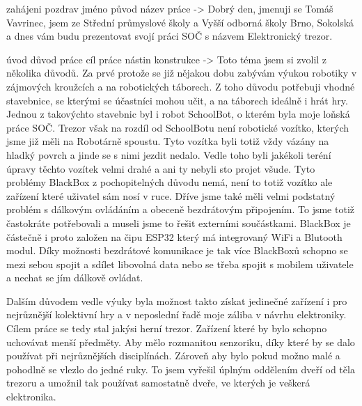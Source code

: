 zahájeni
{
    pozdrav
    jméno
    původ
    název práce
}-> Dobrý den, jmenuji se Tomáš Vavrinec, jsem ze Střední průmyslové školy a Vyšší odborná školy Brno, Sokolská
    a dnes vám budu prezentovat 
    svojí práci SOČ s názvem Elektronický trezor. %

úvod
{
    důvod práce
    cíl práce
    nástin konstrukce
}-> Toto téma jsem si zvolil z několika důvodů. Za prvé protože se již nějakou dobu zabývám 
    výukou robotiky v zájmových kroužcích a na robotických táborech. Z toho důvodu potřebuji 
    vhodné stavebnice, se kterými se účastníci mohou učit, a na táborech ideálně i hrát hry. 
    Jednou z takovýchto stavebnic byl i robot SchoolBot, o kterém byla moje loňská práce SOČ.
    Trezor však na rozdíl od SchoolBotu není robotické vozítko, kterých jsme již měli na Robotárně
    spoustu. 
    Tyto vozítka byli totiž vždy vázány na hladký povrch a jinde se s nimi jezdit nedalo.
    Vedle toho byli jakékoli teréní úpravy těchto vozítek velmi drahé a ani ty nebyli sto projet všude.
    Tyto problémy BlackBox z pochopitelných důvodu nemá, není to totiž vozítko ale zařízení které uživatel
    sám nosí v ruce.
    Dříve jsme také měli velmi podstatný problém s dálkovým ovládáním a obeceně bezdrátovým připojením.
    To jsme totiž častokráte potřebovali a museli jsme to řešit externími součástkami.
    BlackBox je částečně i proto založen na čipu ESP32 který má integrovaný WiFi a Blutooth modul.
    Díky možnosti bezdrátové komunikace je tak více BlackBoxů schopno se mezi sebou spojit a sdílet 
    libovolná data nebo se třeba spojit s mobilem uživatele a nechat se jím dálkově ovládat.
    


    Dalším důvodem vedle výuky byla možnost 
    takto získat jedinečné zařízení i pro nejrůznější kolektivní hry a v neposlední řadě 
    moje záliba v návrhu elektroniky. 
    Cílem práce se tedy stal jakýsi herní trezor. Zařízení které by bylo schopno uchovávat 
    menší předměty. Aby mělo rozmanitou senzoriku, díky které by se dalo používat při 
    nejrůznějších disciplínách. Zároveň aby bylo pokud možno malé a pohodlně se vlezlo 
    do jedné ruky. To jsem vyřešil úplným oddělením dveří od těla trezoru a umožnil 
    tak používat samostatně dveře, ve kterých je veškerá elektronika.

